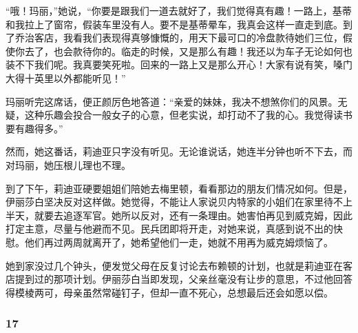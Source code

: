\par “哦！玛丽，”她说，“你要是跟我们一道去就好了，我们觉得真有趣！一路上，基蒂和我拉上了窗帘，假装车里没有人。要不是基蒂晕车，我真会这样一直走到底。到了乔治客店，我看我们表现得真够慷慨的，用天下最可口的冷盘款待她们三位，假使你去了，也会款待你的。临走的时候，又是那么有趣！我还以为车子无论如何也装不下我们呢。我真要笑死啦。回来的一路上又是那么开心！大家有说有笑，嗓门大得十英里以外都能听见！”
\par 玛丽听完这席话，便正颜厉色地答道：“亲爱的妹妹，我决不想煞你们的风景。无疑，这种乐趣会投合一般女子的心意，但老实说，却打动不了我的心。我觉得读书要有趣得多。”
\par 然而，她这番话，莉迪亚只字没有听见。无论谁说话，她连半分钟也听不下去，而对玛丽，她压根儿理也不理。
\par 到了下午，莉迪亚硬要姐姐们陪她去梅里顿，看看那边的朋友们情况如何。但是，伊丽莎白坚决反对这样做。她觉得，不能让人家说贝内特家的小姐们在家里待不上半天，就要去追逐军官。她所以反对，还有一条理由。她害怕再见到威克姆，因此打定主意，尽量与他避而不见。民兵团即将开走，对她来说，真感到说不出的快慰。他们再过两周就离开了，她希望他们一走，她就不用再为威克姆烦恼了。
\par 她到家没过几个钟头，便发觉父母在反复讨论去布赖顿的计划，也就是莉迪亚在客店提到过的那项计划。伊丽莎白当即发现，父亲丝毫没有让步的意思，不过他回答得模棱两可，母亲虽然常碰钉子，但却一直不死心，总想最后还会如愿以偿。


\subsubsection*{17}

